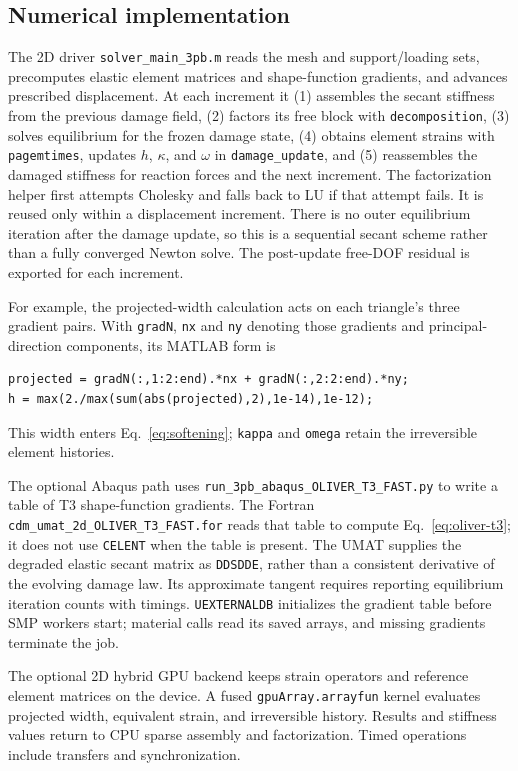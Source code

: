 \documentclass[preprint,11pt,a4paper]{elsarticle}
\begin{document}
\subsection{Numerical implementation}

The 2D driver \texttt{solver\_main\_3pb.m} reads the mesh and support/loading
sets, precomputes elastic element matrices and shape-function gradients,
and advances prescribed displacement. At each increment it (1) assembles
the secant stiffness from the previous damage field, (2) factors its free
block with \texttt{decomposition}, (3) solves equilibrium for the frozen
damage state, (4) obtains element strains with \texttt{pagemtimes}, updates
$h$, $\kappa$, and $\omega$ in \texttt{damage\_update}, and (5) reassembles
the damaged stiffness for reaction forces and the next increment. The
factorization helper first attempts Cholesky and falls back to LU if
that attempt fails. It is reused only within a displacement increment. There is no
outer equilibrium iteration after the damage update, so this is a
sequential secant scheme rather than a fully converged Newton solve.
The post-update free-DOF residual is exported for each increment.

For example, the projected-width calculation acts on each triangle's
three gradient pairs. With \texttt{gradN}, \texttt{nx} and \texttt{ny}
denoting those gradients and principal-direction components, its MATLAB form is
\begin{verbatim}
projected = gradN(:,1:2:end).*nx + gradN(:,2:2:end).*ny;
h = max(2./max(sum(abs(projected),2),1e-14),1e-12);
\end{verbatim}
This width enters Eq.~\eqref{eq:softening}; \texttt{kappa} and
\texttt{omega} retain the irreversible element histories.

The optional Abaqus path uses \texttt{run\_3pb\_abaqus\_OLIVER\_T3\_FAST.py}
to write a table of T3 shape-function gradients. The Fortran
\texttt{cdm\_umat\_2d\_OLIVER\_T3\_FAST.for} reads that table to compute
Eq.~\eqref{eq:oliver-t3}; it does not use \texttt{CELENT} when the table
is present. The UMAT supplies the degraded elastic secant matrix as
\texttt{DDSDDE}, rather than a consistent derivative of the evolving
damage law. Its approximate tangent requires reporting equilibrium
iteration counts with timings. \texttt{UEXTERNALDB} initializes the
gradient table before SMP workers start; material calls read its saved
arrays, and missing gradients terminate the job.

The optional 2D hybrid GPU backend keeps strain operators and reference
element matrices on the device. A fused \texttt{gpuArray.arrayfun} kernel
evaluates projected width, equivalent strain, and irreversible history.
Results and stiffness values return to CPU sparse assembly and factorization.
Timed operations include transfers and synchronization.
\end{document}
